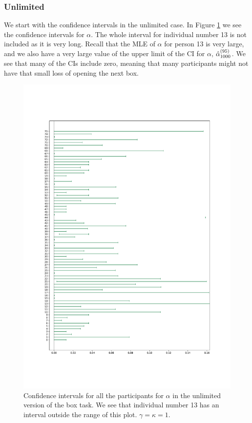 \subsubsection{Unlimited}
\label{chapter:cis_unlimited}
We start with the confidence intervals in the unlimited case. In Figure \ref{fig:all_cis_alpha_unlim_v2} we see the confidence intervals for $\alpha$. The whole interval for individual number 13 is not included as it is very long. Recall that the MLE of $\alpha$ for person 13 is very large, and we also have a very large value of the upper limit of the CI for $\alpha$, $\hat{\alpha}_{1000}^{(95)}$. We see that many of the CIs include zero, meaning that many participants might not have that small loss of opening the next box. 
\begin{figure}
    \centering
    \includegraphics[scale=0.37]{pictures/all_cis_unlim_alpha_pdf.pdf}
    \caption[CIs for $\alpha$, unlimited. $\gamma=\kappa=1$]{Confidence intervals for all the participants for $\alpha$ in the unlimited version of the box task. We see that individual number 13 has an interval outside the range of this plot. $\gamma=\kappa=1$.}
    \label{fig:all_cis_alpha_unlim_v2}
\end{figure}



